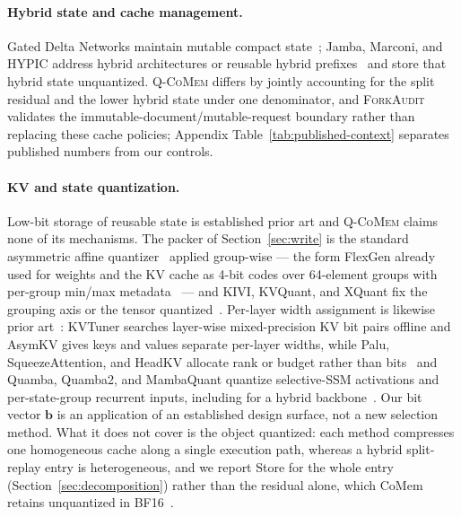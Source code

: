 \documentclass{article}
\newcommand{\qcomem}{\textsc{Q-CoMem}}
\newcommand{\method}{\textsc{ForkAudit}}
\begin{document}
\paragraph{Hybrid state and cache management.}
Gated Delta Networks maintain mutable compact state~\citep{yang2025gateddeltanet};
Jamba, Marconi, and HYPIC address hybrid architectures or reusable hybrid
prefixes~\citep{lieber2025jamba,pan2025marconi,liu2026hypic} and store that
hybrid state unquantized.  \qcomem{} differs by jointly accounting for the split
residual and the lower hybrid state under one denominator, and \method{}
validates the immutable-document/mutable-request boundary rather than replacing
these cache policies; Appendix Table~\ref{tab:published-context} separates
published numbers from our controls.

\paragraph{KV and state quantization.}
Low-bit storage of reusable state is established prior art and \qcomem{} claims
none of its mechanisms. The packer of Section~\ref{sec:write} is the standard
asymmetric affine quantizer~\citep{jacob2018quantization} applied group-wise
--- the form FlexGen already used for weights and the KV cache as 4-bit codes
over 64-element groups with per-group min/max metadata~\citep{sheng2023flexgen}
--- and KIVI, KVQuant, and XQuant fix the
grouping axis or the tensor
quantized~\citep{liu2024kivi,hooper2024kvquant,tomar2025xquant}. Per-layer
width assignment is likewise prior
art~\citep{li2025kvtuner,tao2025asymkv,yang2024mikv}: KVTuner searches
layer-wise mixed-precision KV bit pairs offline and AsymKV gives keys and
values separate per-layer widths, while Palu, SqueezeAttention,
and HeadKV allocate rank or budget rather than
bits~\citep{chang2025palu,wang2025squeezeattention,fu2025headkv} and Quamba,
Quamba2, and MambaQuant quantize selective-SSM activations and per-state-group
recurrent inputs, including for a hybrid
backbone~\citep{chiang2025quamba,chiang2025quamba2,yue2025mambaquant}. Our bit vector $\mathbf b$ is an application of an established design surface,
not a new selection method. What it does not cover is the object quantized: each
method compresses one homogeneous cache along a single execution path, whereas a
hybrid split-replay entry is heterogeneous, and we report Store for the whole
entry (Section~\ref{sec:decomposition}) rather than the residual alone, which
CoMem retains unquantized in BF16~\citep{liu2026comem}.
\end{document}
